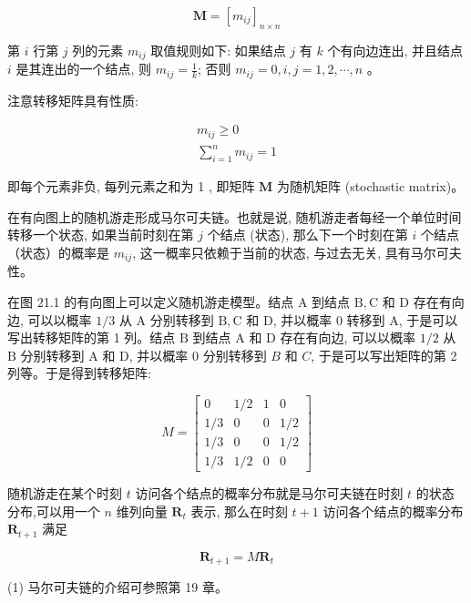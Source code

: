 \documentclass[10pt]{article}
\begin{document}
\begin{CJK*}{UTF8}{bsmi}
\begin{equation*}
\boldsymbol{M}=\left[m_{i j}\right]_{n \times n} \tag{21.1}
\end{equation*}


第 $i$ 行第 $j$ 列的元素 $m_{i j}$ 取值规则如下: 如果结点 $j$ 有 $k$ 个有向边连出, 并且结点 $i$ 是其连出的一个结点, 则 $m_{i j}=\frac{1}{k}$; 否则 $m_{i j}=0, i, j=1,2, \cdots, n$ 。

注意转移矩阵具有性质:


\begin{gather*}
m_{i j} \geqslant 0  \tag{21.2}\\
\sum_{i=1}^{n} m_{i j}=1 \tag{21.3}
\end{gather*}


即每个元素非负, 每列元素之和为 1 , 即矩阵 $\boldsymbol{M}$ 为随机矩阵 (stochastic matrix)。

在有向图上的随机游走形成马尔可夫链。也就是说, 随机游走者每经一个单位时间转移一个状态, 如果当前时刻在第 $j$ 个结点 (状态), 那么下一个时刻在第 $i$ 个结点（状态）的概率是 $m_{i j}$, 这一概率只依赖于当前的状态, 与过去无关, 具有马尔可夫性。

在图 21.1 的有向图上可以定义随机游走模型。结点 $\mathrm{A}$ 到结点 $\mathrm{B}, \mathrm{C}$ 和 $\mathrm{D}$ 存在有向边, 可以以概率 $1 / 3$ 从 $\mathrm{A}$ 分别转移到 $\mathrm{B}, \mathrm{C}$ 和 $\mathrm{D}$, 并以概率 0 转移到 $\mathrm{A}$, 于是可以写出转移矩阵的第 1 列。结点 $\mathrm{B}$ 到结点 $\mathrm{A}$ 和 $\mathrm{D}$ 存在有向边, 可以以概率 $1 / 2$ 从 $\mathrm{B}$ 分别转移到 $\mathrm{A}$ 和 $\mathrm{D}$, 并以概率 0 分别转移到 $B$ 和 $C$, 于是可以写出矩阵的第 2 列等。于是得到转移矩阵:

$$
M=\left[\begin{array}{cccc}
0 & 1 / 2 & 1 & 0 \\
1 / 3 & 0 & 0 & 1 / 2 \\
1 / 3 & 0 & 0 & 1 / 2 \\
1 / 3 & 1 / 2 & 0 & 0
\end{array}\right]
$$

随机游走在某个时刻 $t$ 访问各个结点的概率分布就是马尔可夫链在时刻 $t$ 的状态分布,可以用一个 $n$ 维列向量 $\boldsymbol{R}_{t}$ 表示, 那么在时刻 $t+1$ 访问各个结点的概率分布 $\boldsymbol{R}_{t+1}$ 满足


\begin{equation*}
\boldsymbol{R}_{t+1}=M \boldsymbol{R}_{t} \tag{21.4}
\end{equation*}


(1) 马尔可夫链的介绍可参照第 19 章。


\end{CJK*}
\end{document}
